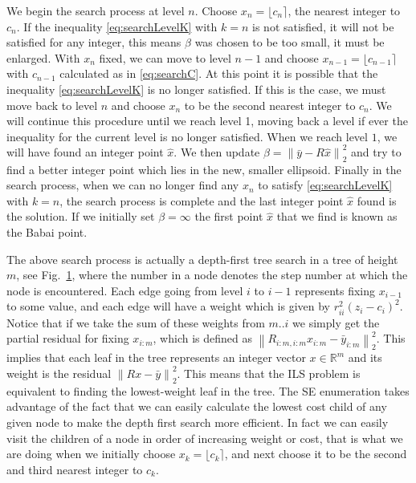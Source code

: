 \documentclass[12pt,Bold,letterpaper]{mcgilletdclass}
\begin{document}
We begin the search process
at level $n$. Choose $x_n = \lfloor c_n \rceil$, the nearest
integer to $c_n$. If the inequality \eqref{eq:searchLevelK} with $k=n$
is not satisfied, it will not be satisfied for any integer, this means $\beta$
was chosen to be too small, it must be enlarged. With $x_n$ fixed, we can move
to level $n-1$ and choose $x_{n-1} = \lfloor c_{n-1} \rceil$ with $c_{n-1}$ calculated as in \eqref{eq:searchC}. At this point it is possible that the inequality \eqref{eq:searchLevelK} is no longer satisfied. If this is the case, we must move back to level $n$ and choose $x_n$ to be the second nearest integer to $c_n$.  We will continue this procedure until we reach
level 1, moving back a level if ever the inequality for the current level is no longer satisfied. When we reach level $1$, we will have found an integer point $\hat{x}$. We then update $\beta = \left \| \bar{y} - R\hat{x} \right \|_2^2$ and try to find a better integer point which lies in the new, smaller ellipsoid. Finally in the search process, when we can no longer find any $x_n$ to satisfy \eqref{eq:searchLevelK} with $k=n$, the search process is complete and the last integer point $\hat{x}$ found is the solution. If we initially set $\beta = \infty$ the first point $\hat{x}$ that we find is known as the Babai point.

\begin{figure}

\label{fig:treeSearch}
\end{figure}

The above search process is actually a depth-first tree search in a tree of height $m$, see Fig.\ \ref{fig:treeSearch},
where the number  in a node  denotes the step number at which the node is encountered. Each edge going from level $i$ to $i-1$ represents fixing $x_{i-1}$ to some value, and each edge will have a weight which is given by $r_{ii}^2(z_i -
c_i)^2$. Notice that if we take the sum of these weights from $m..i$ we simply get the partial
residual for fixing $x_{i:m}$, which is defined as $\left \| R_{i:m,i:m}x_{i:m} -
\bar{y}_{i:m} \right \|_2^2$. This implies that each leaf in the tree
represents an integer vector $x \in \mathbb{R}^m$ and its weight is the residual $\left \|
Rx - \bar{y} \right \|_2^2$. This means that the ILS problem is equivalent to
finding the lowest-weight leaf in the tree. The SE enumeration takes advantage
of the fact that we can easily calculate the lowest cost child of any given
node to make the depth first search more efficient. In fact we can easily visit
the children of a node in order of increasing weight or cost, that is what we are doing when we initially choose $x_k = \lfloor c_k \rceil$, and next choose it to be the second and third nearest integer to $c_k$.
\end{document}
